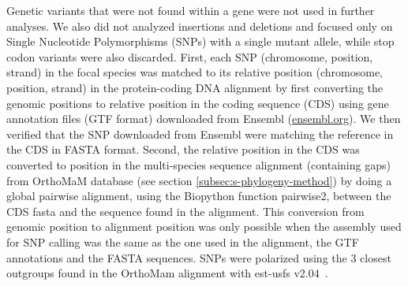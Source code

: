 \documentclass{article}
\begin{document}
    Genetic variants that were not found within a gene were not used in further analyses.
    We also did not analyzed insertions and deletions and focused only on Single Nucleotide Polymorphisms (SNPs) with a single mutant allele, while stop codon variants were also discarded.
    First, each SNP (chromosome, position, strand) in the focal species was matched to its relative position (chromosome, position, strand) in the protein-coding DNA alignment by first converting the genomic positions to relative position in the coding sequence (CDS) using gene annotation files (GTF format) downloaded from Ensembl (\url{ensembl.org}).
    We then verified that the SNP downloaded from Ensembl were matching the reference in the CDS in FASTA format.
    Second, the relative position in the CDS was converted to position in the multi-species sequence alignment (containing gaps) from OrthoMaM database (see section \ref{subsec:s-phylogeny-method}) by doing a global pairwise alignment, using the Biopython function pairwise2, between the CDS fasta and the sequence found in the alignment.
    This conversion from genomic position to alignment position was only possible when the assembly used for SNP calling was the same as the one used in the alignment, the GTF annotations and the FASTA sequences.
    SNPs were polarized using the $3$ closest outgroups found in the OrthoMam alignment with est-usfs v2.04~\cite{keightley_inferring_2018}.
\end{document}
